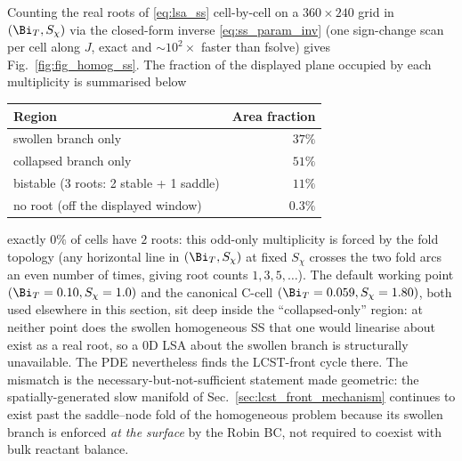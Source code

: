 Counting the real roots of \eqref{eq:lsa_ss} cell-by-cell on a
$360\times 240$ grid in $(\Bi_T, S_\chi)$ via the closed-form
inverse \eqref{eq:ss_param_inv} (one sign-change scan per cell along
$J$, exact and ${\sim}10^{2}\times$ faster than fsolve) gives
Fig.~\ref{fig:fig_homog_ss}.  The fraction of the displayed plane
occupied by each multiplicity is summarised below
\begin{center}
\begin{tabular}{lr}
\hline
Region & Area fraction \\
\hline
swollen branch only & $37\%$ \\
collapsed branch only & $51\%$ \\
bistable (3 roots: 2 stable + 1 saddle) & $11\%$ \\
no root (off the displayed window) & $0.3\%$ \\
\hline
\end{tabular}
\end{center}
exactly $0\%$ of cells have $2$ roots: this odd-only multiplicity is
forced by the fold topology (any horizontal line in
$(\Bi_T, S_\chi)$ at fixed $S_\chi$ crosses the two fold arcs an even
number of times, giving root counts $1, 3, 5, \ldots$).  The default
working point $(\Bi_T=0.10,S_\chi=1.0)$ and the canonical C-cell
$(\Bi_T=0.059, S_\chi=1.80)$, both used elsewhere in this section,
sit deep inside the ``collapsed-only'' region: at neither point does
the swollen homogeneous SS that one would linearise about exist as a
real root, so a 0D LSA about the swollen branch is structurally
unavailable.  The PDE nevertheless finds the LCST-front cycle there.
The mismatch is the
necessary-but-not-sufficient statement made geometric: the
spatially-generated slow manifold of
Sec.~\ref{sec:lcst_front_mechanism} continues to exist past the
saddle--node fold of the homogeneous problem because its swollen
branch is enforced \emph{at the surface} by the Robin BC, not
required to coexist with bulk reactant balance.

